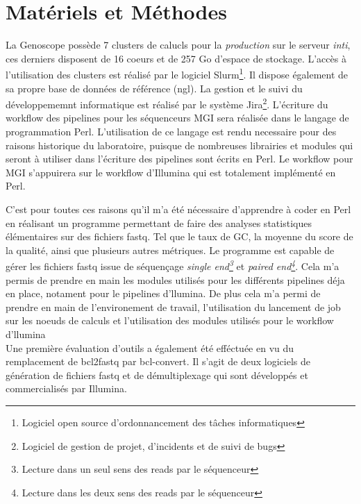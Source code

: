 \section{Matériels et Méthodes}

La Genoscope possède 7 clusters de calucls pour la \emph{production} sur le serveur \emph{inti}, ces derniers disposent de 16 coeurs et de 257 Go d'espace de stockage. L'accès à l'utilisation des clusters est réalisé par le logiciel Slurm\footnote{Logiciel open source d'ordonnancement des tâches informatiques}. Il dispose également de sa propre base de données de référence (ngl). La gestion et le suivi du développememnt informatique est réalisé par le système Jira\footnote{Logiciel de gestion de projet, d'incidents et de suivi de bugs}. 
L'écriture du workflow des pipelines pour les séquenceurs MGI sera réalisée dans le langage de programmation Perl. L'utilisation de ce langage est rendu necessaire pour des raisons historique du laboratoire, puisque de nombreuses librairies et modules qui seront à utiliser dans l'écriture des pipelines sont écrits en Perl. Le workflow pour MGI s'appuirera sur le workflow d'Illumina qui est totalement implémenté en Perl. 

C'est pour toutes ces raisons qu'il m'a été nécessaire d'apprendre à coder en Perl en réalisant un programme permettant de faire des analyses statistiques élémentaires sur des fichiers fastq. Tel que le taux de GC, la moyenne du score de la qualité, ainsi que plusieurs autres métriques. Le programme est capable de gérer les fichiers fastq issue de séquençage \emph{single end\footnote{Lecture dans un seul sens des reads par le séquenceur}} et \emph{paired end\footnote{Lecture dans les deux sens des reads par le séquenceur}}. Cela m'a permis de prendre en main les modules utilisés pour les différents pipelines déja en place, notament pour le pipelines d'llumina. De plus cela m'a permi de prendre en main de l'environement de travail, l'utilisation du lancement de job sur les noeuds de calculs et l'utilisation des modules utilisés pour le workflow d'llumina\\

Une première évaluation d'outils a également été efféctuée en vu du remplacement de bcl2fastq par bcl-convert. Il s'agit de deux logiciels de génération de fichiers fastq et de démultiplexage qui sont développés et commercialisés par Illumina.

